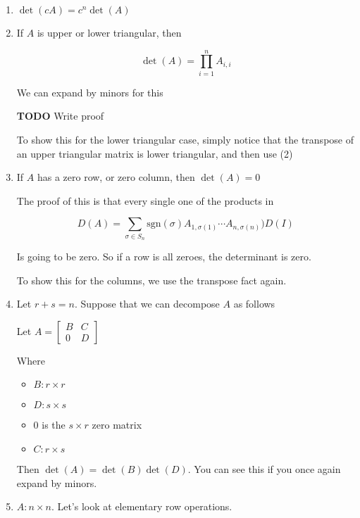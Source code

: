 \documentclass[12pt]{article}
\def\sgn{\text{sgn}}
\newcommand{\TODO}{\color{red}\textbf{TODO}\color{black}}
\begin{document}
\begin{enumerate}
    \item $\det(cA) = c^n \det(A)$
    \item If $A$ is upper or lower triangular, then

      \[
        \det(A) = \prod_{i = 1}^n A_{i, i}
      \]

      We can expand by minors for this


      \TODO{} Write proof

      To show this for the lower triangular case, simply notice that the
      transpose of an upper triangular matrix is lower triangular, and then use
      (2)

    \item If $A$ has a zero row, or zero column, then $\det(A) = 0$

      The proof of this is that every single one of the products in

      \[
        D(A) = \sum_{\sigma \in S_n} \sgn(\sigma) A_{1, \sigma(1)} \cdots A_{n, \sigma(n)} \Big) D(I)
      \]

      Is going to be zero. So if a row is all zeroes, the determinant is zero.

      To show this for the columns, we use the transpose fact again.

    \item Let $r + s = n$. Suppose that we can decompose $A$ as follows

      Let $A = \begin{bmatrix}
        B & C \\
        0 & D
      \end{bmatrix}$

      Where
      \begin{itemize}
        \item $B: r \times r$
        \item $D: s \times s$
        \item $0$ is the $s \times r$ zero matrix
        \item $C: r \times s$
      \end{itemize}

      Then $\det(A) = \det(B) \det(D)$. You can see this if you once again
      expand by minors.

    \item $A: n \times n$. Let's look at elementary row operations.


\end{enumerate}
\end{document}
